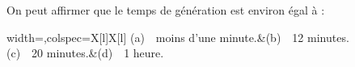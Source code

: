 \begin{enumerate}
	On peut affirmer que le temps de génération est environ égal à :
	
	\begin{tblr}{width=\linewidth,colspec={X[l]X[l]}}
		(a)~~moins d'une minute.&(b)~~12 minutes.\\
		(c)~~20 minutes.&(d)~~1 heure.
	\end{tblr}
\end{enumerate}

